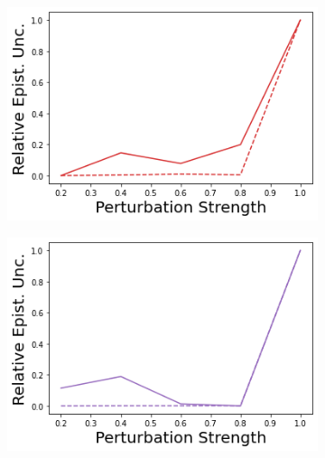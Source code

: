 \begin{figure}
    \begin{subfigure}{.24\textwidth}
        \includegraphics[width=\textwidth]{sections/011_icml2022/resources/transition_shift-DropOut-CartPoleShift-v0-mean_epistemic_uncertainty_.png}
    \end{subfigure}
    \begin{subfigure}{.24\textwidth}
        \includegraphics[width=\textwidth]{sections/011_icml2022/resources/transition_shift-Ensemble-CartPoleShift-v0-mean_epistemic_uncertainty_.png}
    \end{subfigure}
    \begin{subfigure}{.24\textwidth}

\end{subfigure}
\end{figure}
